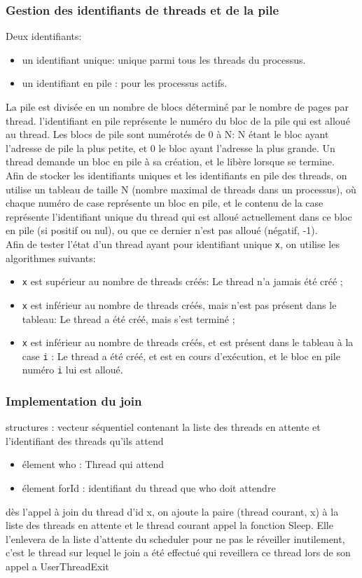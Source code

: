 \documentclass{article}
\begin{document}
		\subsubsection{Gestion des identifiants de threads et de la pile}
			{Deux identifiants:}
			\begin{itemize}
				\item{un identifiant unique: unique parmi tous les threads du processus.}
				\item{un identifiant en pile : pour les processus actifs.}
			\end{itemize}
			{La pile est divisée en un nombre de blocs déterminé par le nombre de pages par thread. l'identifiant en pile représente le numéro du bloc de la pile qui est alloué au thread. Les blocs de pile sont numérotés de 0 à N: N étant le bloc ayant l'adresse de pile la plus petite, et 0 le bloc ayant l'adresse la plus grande. Un thread demande un bloc en pile à sa création, et le libère lorsque se termine. \\
			Afin de stocker les identifiants uniques et les identifiants en pile des threads, on utilise un tableau de taille N (nombre maximal de threads dans un processus), où chaque numéro de case représente un bloc en pile, et le contenu de la case représente l'identifiant unique du thread qui est alloué actuellement dans ce bloc en pile (si positif ou nul), ou que ce dernier n'est pas alloué (négatif, -1).\\
			Afin de tester l'état d'un thread ayant pour identifiant unique \texttt{x}, on utilise les algorithmes suivants: }
				\begin{itemize}
					\item{\texttt{x} est supérieur au nombre de threads créés: } Le thread n'a jamais été créé ;
					\item{\texttt{x} est inférieur au nombre de threads créés, mais n'est pas présent dans le tableau: } Le thread a été créé, mais s'est terminé ;
					\item{\texttt{x} est inférieur au nombre de threads créés, et est présent dans le tableau à la case \texttt{i} : Le thread a été créé, et est en cours d'exécution, et le bloc en pile numéro \texttt{i} lui est alloué.}
				\end{itemize}
		\subsubsection{Implementation du join}
			structures : vecteur séquentiel contenant la liste des threads en attente et l'identifiant des threads qu'ils attend
				\begin{itemize}
					\item élement who : Thread qui attend
					\item élement forId : identifiant du thread que who doit attendre
				\end{itemize}
			dès l'appel à join du thread d'id x, on ajoute la paire (thread courant, x) à la liste des threads en attente et le thread courant appel la fonction Sleep. Elle l'enlevera de la liste d'attente du scheduler pour ne pas le réveiller inutilement, c'est le thread sur lequel le join a été effectué qui reveillera ce thread lors de son appel a UserThreadExit
\end{document}
